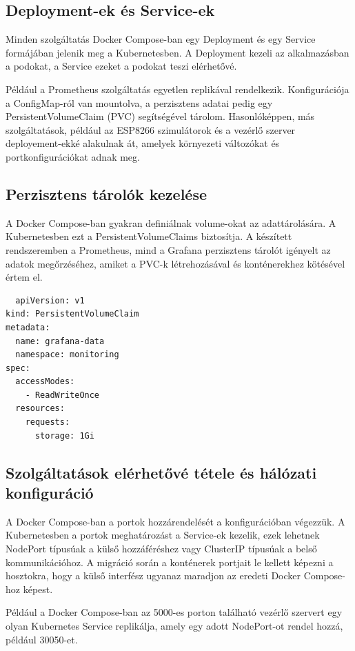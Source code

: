 \subsection{Deployment-ek és Service-ek}

Minden szolgáltatás Docker Compose-ban egy Deployment és egy Service formájában jelenik meg a Kubernetesben. 
A Deployment kezeli az alkalmazásban a podokat, a Service ezeket a podokat teszi elérhetővé.

Például a Prometheus szolgáltatás egyetlen replikával rendelkezik. Konfigurációja a ConfigMap-ról van mountolva, 
a perzisztens adatai pedig egy PersistentVolumeClaim (PVC) segítségével tárolom. Hasonlóképpen, más szolgáltatások, 
például az ESP8266 szimulátorok és a vezérlő szerver deployement-ekké alakulnak át, amelyek környezeti változókat 
és portkonfigurációkat adnak meg.

\subsection{Perzisztens tárolók kezelése}

A Docker Compose-ban gyakran definiálnak volume-okat az adattárolására. A Kubernetesben ezt a 
PersistentVolumeClaims biztosítja. A készített rendszeremben a Prometheus, mind a Grafana perzisztens 
tárolót igényelt az adatok megőrzéséhez, amiket a PVC-k létrehozásával és konténerekhez kötésével értem el.

\begin{lstlisting}
  apiVersion: v1
kind: PersistentVolumeClaim
metadata:
  name: grafana-data
  namespace: monitoring
spec:
  accessModes:
    - ReadWriteOnce
  resources:
    requests:
      storage: 1Gi
\end{lstlisting}

\subsection{Szolgáltatások elérhetővé tétele és hálózati konfiguráció}

A Docker Compose-ban a portok hozzárendelését a konfigurációban végezzük. 
A Kubernetesben a portok meghatározást a Service-ek kezelik, ezek lehetnek 
NodePort típusúak a külső hozzáféréshez vagy ClusterIP típusúak a belső kommunikációhoz. 
A migráció során a konténerek portjait le kellett képezni a hosztokra, hogy a külső interfész 
ugyanaz maradjon az eredeti Docker Compose-hoz képest.

Például a Docker Compose-ban az 5000-es porton található vezérlő szervert egy olyan Kubernetes Service replikálja, 
amely egy adott NodePort-ot rendel hozzá, például 30050-et.

